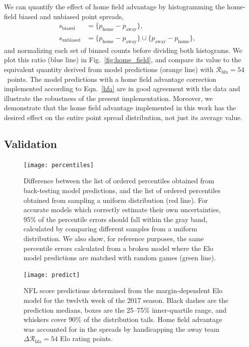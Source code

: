 \documentclass[aps,prc,reprint,amsmath,superscriptaddress,nofootinbib]{revtex4-1}
\newcommand{\R}{\mathcal{R}}
\begin{document}
We can quantify the effect of home field advantage by histogramming the home-field biased and unbiased point spreads,
\begin{align}
  s_\text{biased} &= \{p_\text{home} - p_\text{away}\},\nonumber \\
  s_\text{unbiased} &= \{p_\text{home} - p_\text{away}\} \cup \{p_\text{away} - p_\text{home}\},
\end{align}
and normalizing each set of binned counts before dividing both histograms.
We plot this ratio (blue line) in Fig.~\ref{fig:home_field}, and compare its value to the equivalent quantity derived from model predictions (orange line) with ${\mathcal{R}_\text{hfa} = 54}$~points.
The model predictions with a home field advantage correction implemented according to Eqn.~\eqref{hfa} are in good agreement with the data and illustrate the robustness of the present implementation. 
Moreover, we demonstrate that the home field advantage implemented in this work has the desired effect on the entire point spread distribution, not just its average value. 

\subsection{Validation}

\begin{figure}
  \texttt{[image: percentiles]}
  \caption{\label{fig:percentiles} Difference between the list of ordered percentiles obtained from back-testing model predictions, and the list of ordered percentiles obtained from sampling a uniform distribution (red line).
For accurate models which correctly estimate their own uncertainties, 95\% of the percentile errors should fall within the gray band, calculated by comparing different samples from a uniform distribution.
  We also show, for reference purposes, the same percentile errors calculated from a broken model where the Elo model predictions are matched with random games (green line).
  }
\end{figure}

\begin{figure}
  \texttt{[image: predict]}
  \caption{\label{fig:predict} NFL score predictions determined from the margin-dependent Elo model for the twelvth week of the 2017 season. Black dashes are the prediction medians, boxes are the 25--75\% inner-quartile range, and whiskers cover 90\% of the distribution tails. Home field advantage was accounted for in the spreads by handicapping the away team $\Delta\R_\text{hfa}=54$ Elo rating points.}
\end{figure}
\end{document}

